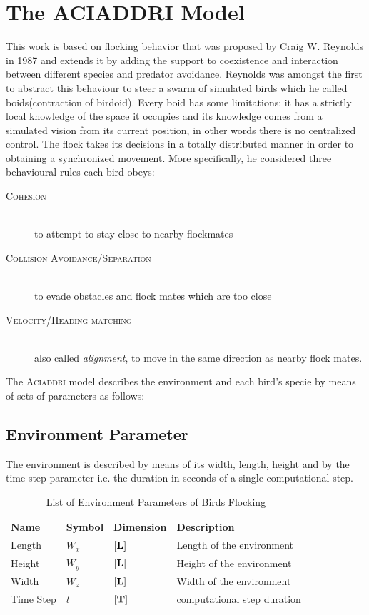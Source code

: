 \section{The ACIADDRI Model}
\label{sect:aciaddri}

This work is  based on flocking behavior that was proposed by Craig W. Reynolds
in 1987 and extends it by adding the support to coexistence and interaction
between different species and predator avoidance.
Reynolds was amongst the first to abstract this behaviour to steer a swarm
of simulated birds which he called boids\cite{Reynolds}(contraction of birdoid).
Every boid has some limitations:
it has a strictly local knowledge of the space it occupies and its knowledge
comes from a simulated vision from its current position, in other words there is
no centralized control. The flock takes its decisions in a totally distributed
manner in order to obtaining a synchronized movement. More specifically, he
considered three behavioural rules each bird obeys:

\begin{description}
\item[\textsc{Cohesion}] \hfill\\
	to attempt to stay close to nearby flockmates
\item[\textsc{Collision Avoidance/Separation}] \hfill\\
	to evade obstacles and flock mates which are too
close
\item[\textsc{Velocity/Heading matching}] \hfill\\
	also called \textit{alignment}, to move in the same direction as nearby flock
	mates.
\end{description}

The \textsc{Aciaddri} model describes the environment and each bird's specie  by
means of  sets of parameters as follows:


\subsection{Environment Parameter}
 The environment is described by means of its width, length, height and by the
 time step parameter i.e. the duration in seconds of a single computational
 step. 
 \begin{table}[h!]
	\centering
	\begin{tabular}{l l l l}
	\hline
	Name & Symbol & Dimension & Description\\
	\hline
	Length &  \(W_x\) & $\left[\vb{L}\right]$ & Length of the environment \\
	Height & \(W_y\) & $\left[\vb{L}\right]$ & Height of the environment \\
	Width & \(W_z\) & $\left[\vb{L}\right]$ & Width of the environment \\
	Time Step & \(t\) & $\left[\vb{T}\right]$ & computational step duration \\
	\hline
	\end{tabular}
	\caption[List of Environment Parameters]{List of Environment Parameters of Birds Flocking}
	\label{tab:EnvironmentParameters}
\end{table}


